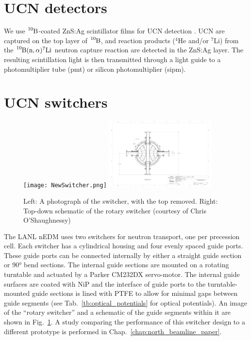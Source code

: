 
\section{UCN detectors}\label{sec:ucn_detectors}


We use $\ce{^{10}B}$-coated ZnS:Ag scintillator films for UCN detection \cite{jeph_b10_2011}. UCN are captured on the top layer of $\ce{^{10}B}$, and reaction products ($^4$He and/or $^7$Li) from the $\ce{^{10}B}(\text{n},\alpha)^7\text{Li}$ neutron capture reaction are detected in the ZnS:Ag layer. The resulting scintillation light is then transmitted through a light guide to a photomultiplier tube (\acrshort*{pmt}) or silicon photomultiplier (\acrshort*{sipm}).


\section{UCN switchers}\label{sec:lanl_switchers}


\begin{figure}
    \centering
    \texttt{[image: NewSwitcher.png]}
    \hspace{1em}
    \includegraphics[width=0.5\textwidth]{figures/switcher_schematic.pdf}
    \caption[Photograph and schematic of rotary switcher]{Left: A photograph of the switcher, with the top removed. Right: Top-down schematic of the rotary switcher (courtesy of Chris O'Shaughnessy) }\label{fig:NewSwitcher}
\end{figure}

The LANL nEDM uses two switchers for neutron transport, one per precession cell. Each switcher has a cylindrical housing and four evenly spaced guide ports. These guide ports can be connected internally by either a straight guide section or \ang{90} bend sections. The internal guide sections are mounted on a rotating turntable and actuated by a Parker CM232DX servo-motor. The internal guide surfaces are coated with NiP and the interface of guide ports to the turntable-mounted guide sections is lined with PTFE to allow for minimal gaps between guide segments (see Tab.~\ref{tb:optical_potentials} for optical potentials). An image of the ``rotary switcher'' and a schematic of the guide segments within it are shown in Fig.~\ref{fig:NewSwitcher}. A study comparing the performance of this switcher design to a different prototype is performed in Chap.~\ref{chap:north_beamline_paper}.

